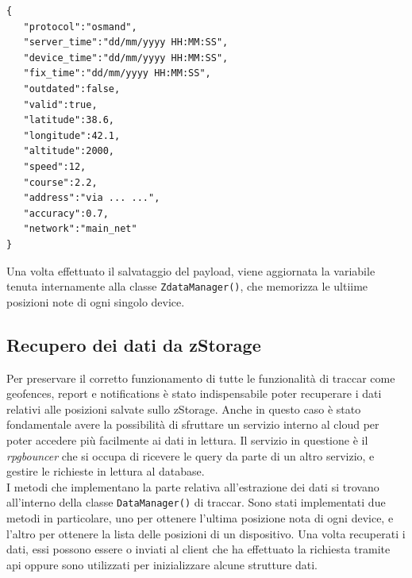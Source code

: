 \documentclass[a4paper,titlepage,12pt]{book}
\begin{document}
{\begin{verbatim}
{
   "protocol":"osmand",
   "server_time":"dd/mm/yyyy HH:MM:SS",
   "device_time":"dd/mm/yyyy HH:MM:SS",
   "fix_time":"dd/mm/yyyy HH:MM:SS",
   "outdated":false,
   "valid":true,
   "latitude":38.6,
   "longitude":42.1,
   "altitude":2000,
   "speed":12,
   "course":2.2,
   "address":"via ... ...",
   "accuracy":0.7,
   "network":"main_net"
}
\end{verbatim}

\noindent Una volta effettuato il salvataggio del payload, viene aggiornata la variabile tenuta internamente alla classe \texttt{ZdataManager()}, che memorizza le ultiime posizioni note di ogni singolo device.

\subsection{
Recupero dei dati da zStorage}
Per preservare il corretto funzionamento di tutte le funzionalità di traccar come geofences, report e notifications è stato indispensabile poter recuperare i dati relativi alle posizioni salvate sullo zStorage. Anche in questo caso è stato fondamentale avere la possibilità di sfruttare un servizio interno al cloud per poter accedere più facilmente ai dati in lettura. Il servizio in questione è il \textit{rpgbouncer} che si occupa di ricevere le query da parte di un altro servizio, e gestire le richieste in lettura al database. \\
I metodi che implementano la parte relativa all'estrazione dei dati si trovano all'interno della classe \texttt{DataManager()} di traccar. Sono stati implementati due metodi in particolare, uno per ottenere l'ultima posizione nota di ogni device, e l'altro per ottenere la lista delle posizioni di un dispositivo. Una volta recuperati i dati, essi possono essere o inviati al client che ha effettuato la richiesta tramite api oppure sono utilizzati per inizializzare alcune strutture dati.

}
\end{document}
